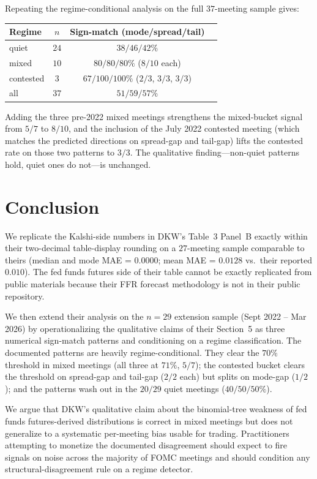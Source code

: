 \documentclass[11pt]{article}
\begin{document}
Repeating the regime-conditional analysis on the full $37$-meeting
sample gives:

\begin{center}
\begin{tabular}{lccc}
\toprule
Regime & $n$ & Sign-match (mode/spread/tail) \\
\midrule
quiet     & $24$ & $38/46/42\%$ \\
mixed     & $10$ & $80/80/80\%$ ($8/10$ each) \\
contested & $3$  & $67/100/100\%$ ($2/3$, $3/3$, $3/3$) \\
\midrule
all       & $37$ & $51/59/57\%$ \\
\bottomrule
\end{tabular}
\end{center}

Adding the three pre-2022 mixed meetings strengthens the mixed-bucket
signal from $5/7$ to $8/10$, and the inclusion of the July 2022
contested meeting (which matches the predicted directions on
spread-gap and tail-gap) lifts the contested rate on those two
patterns to $3/3$. The qualitative finding---non-quiet patterns
hold, quiet ones do not---is unchanged.

\section{Conclusion}

We replicate the Kalshi-side numbers in DKW's Table~3 Panel~B exactly
within their two-decimal table-display rounding on a $27$-meeting
sample comparable to theirs (median and mode MAE = $0.0000$; mean MAE
= $0.0128$ vs.\ their reported $0.010$). The fed funds futures side of
their table cannot be exactly replicated from public materials because
their FFR forecast methodology is not in their public repository.

We then extend their analysis on the $n=29$ extension sample (Sept
2022 -- Mar 2026) by operationalizing the qualitative claims of
their Section~5 as three numerical sign-match patterns and
conditioning on a regime classification. The documented patterns
are heavily regime-conditional. They clear the $70\%$ threshold
in mixed meetings (all three at $71\%$, $5/7$); the contested
bucket clears the threshold on spread-gap and tail-gap ($2/2$
each) but splits on mode-gap ($1/2$); and the patterns wash out in
the $20/29$ quiet meetings ($40/50/50\%$).

We argue that DKW's qualitative claim about the binomial-tree
weakness of fed funds futures-derived distributions is correct in
mixed meetings but does not generalize to a systematic per-meeting
bias usable for trading. Practitioners attempting to monetize the
documented disagreement should expect to fire signals on noise across
the majority of FOMC meetings and should condition any
structural-disagreement rule on a regime detector.
\end{document}
